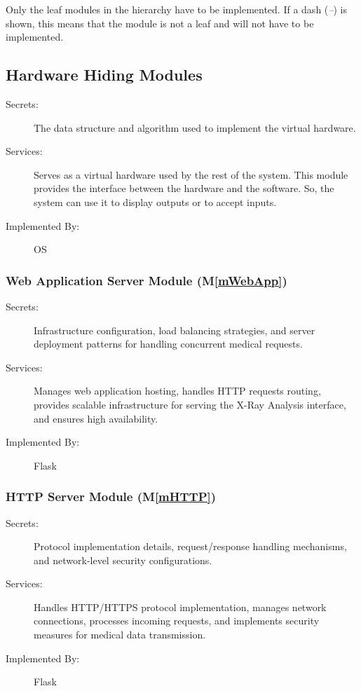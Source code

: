 \documentclass[12pt, titlepage]{article}
\newcommand{\mref}[1]{M\ref{#1}}
\begin{document}
Only the leaf modules in the hierarchy have to be implemented. If a dash
(\emph{--}) is shown, this means that the module is not a leaf and will not have
to be implemented.

\subsection{Hardware Hiding Modules}

\begin{description}
\item[Secrets:]The data structure and algorithm used to implement the virtual
  hardware.
\item[Services:]Serves as a virtual hardware used by the rest of the
  system. This module provides the interface between the hardware and the
  software. So, the system can use it to display outputs or to accept inputs.
\item[Implemented By:] OS
\end{description}
\subsubsection{Web Application Server Module (\mref{mWebApp})}
\begin{description}
\item[Secrets:] Infrastructure configuration, load balancing strategies, and server deployment patterns for handling concurrent medical requests.
\item[Services:] Manages web application hosting, handles HTTP requests routing, provides scalable infrastructure for serving the X-Ray Analysis interface, and ensures high availability.
\item[Implemented By:] Flask
\end{description}
\subsubsection{HTTP Server Module (\mref{mHTTP})}
\begin{description}
\item[Secrets:] Protocol implementation details, request/response handling mechanisms, and network-level security configurations.
\item[Services:] Handles HTTP/HTTPS protocol implementation, manages network connections, processes incoming requests, and implements security measures for medical data transmission.
\item[Implemented By:] Flask
\end{description}
\end{document}
